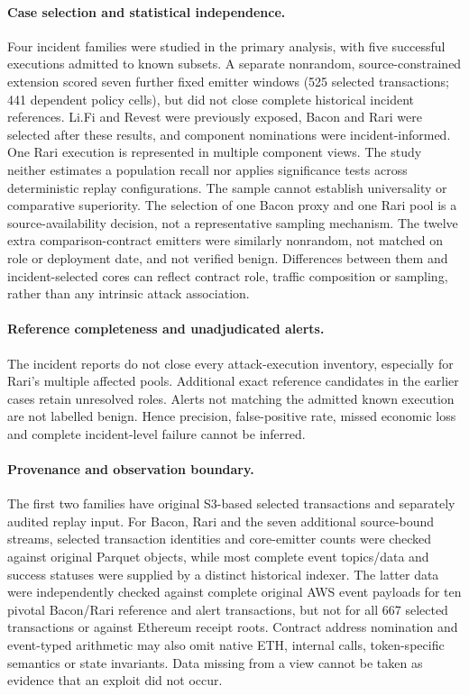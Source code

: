 \documentclass[preprint,12pt,authoryear]{elsarticle}
\begin{document}
\paragraph{Case selection and statistical independence.} Four incident families were studied in the primary analysis, with five successful executions admitted to known subsets. A separate nonrandom, source-constrained extension scored seven further fixed emitter windows (525 selected transactions; 441 dependent policy cells), but did not close complete historical incident references. Li.Fi and Revest were previously exposed, Bacon and Rari were selected after these results, and component nominations were incident-informed. One Rari execution is represented in multiple component views. The study neither estimates a population recall nor applies significance tests across deterministic replay configurations. The sample cannot establish universality or comparative superiority. The selection of one Bacon proxy and one Rari pool is a source-availability decision, not a representative sampling mechanism. The twelve extra comparison-contract emitters were similarly nonrandom, not matched on role or deployment date, and not verified benign. Differences between them and incident-selected cores can reflect contract role, traffic composition or sampling, rather than any intrinsic attack association.

\paragraph{Reference completeness and unadjudicated alerts.} The incident reports do not close every attack-execution inventory, especially for Rari's multiple affected pools. Additional exact reference candidates in the earlier cases retain unresolved roles. Alerts not matching the admitted known execution are not labelled benign. Hence precision, false-positive rate, missed economic loss and complete incident-level failure cannot be inferred.

\paragraph{Provenance and observation boundary.} The first two families have original S3-based selected transactions and separately audited replay input. For Bacon, Rari and the seven additional source-bound streams, selected transaction identities and core-emitter counts were checked against original Parquet objects, while most complete event topics/data and success statuses were supplied by a distinct historical indexer. The latter data were independently checked against complete original AWS event payloads for ten pivotal Bacon/Rari reference and alert transactions, but not for all 667 selected transactions or against Ethereum receipt roots. Contract address nomination and event-typed arithmetic may also omit native ETH, internal calls, token-specific semantics or state invariants. Data missing from a view cannot be taken as evidence that an exploit did not occur.
\end{document}
